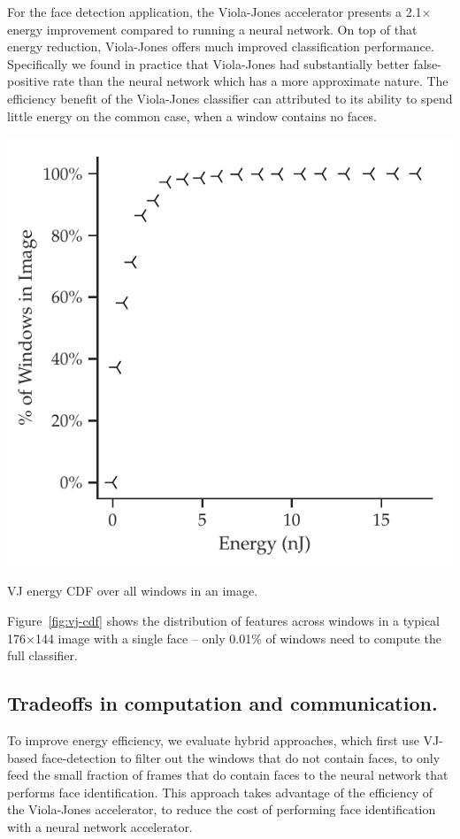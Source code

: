 For the face detection application, the Viola-Jones accelerator presents
a 2.1$\times$ energy improvement compared to running a neural network. On top of that energy reduction, Viola-Jones offers much improved classification performance.
Specifically we found in practice that Viola-Jones had substantially better
false-positive rate than the neural network which has a more approximate nature.
The efficiency benefit of the Viola-Jones classifier
can attributed to its ability to spend little energy on the common case, when a
window contains no faces.

\begin{marginfigure}
\centering
    \begin{center}
      \includegraphics[width=\textwidth]{nsp-figs/eval_vj_cdf2.pdf}
    \end{center}
\caption{VJ energy CDF over all windows in an image.}
\label{fig:vj-cdf}
\end{marginfigure}

Figure~\ref{fig:vj-cdf} shows the
distribution of features across windows in a typical 176$\times$144 image with a single face -- only 0.01\%
of windows need to compute the full classifier.

\subsection{Tradeoffs in computation and communication.} To improve energy efficiency, we evaluate hybrid approaches, which first use VJ-based face-detection
to filter out the windows that do not contain faces, to only feed the small fraction of frames that do contain faces to the neural network that performs face identification.
This approach takes advantage of the efficiency of the Viola-Jones accelerator, to reduce the cost of performing face identification with a neural network accelerator.


